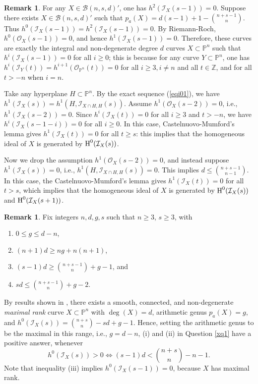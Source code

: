 \documentclass[a4, 11pt]{amsart}
\theoremstyle{plain}
\theoremstyle{definition}
\newtheorem{remark}[theorem]{Remark}
\newcommand{\enm}[1]{\ensuremath{#1}}          %
\newcommand{\cal}[1]{\mathcal{#1}}
\newcommand{\ZZ}{\enm{\mathbb{Z}}}
\newcommand{\PP}{\enm{\mathbb{P}}}
\newcommand{\Bb}{\enm{\cal{B}}}
\newcommand{\Ii}{\enm{\cal{I}}}
\newcommand{\Oo}{\enm{\cal{O}}}
\begin{document}
\begin{remark}
For any $X\in \Bb (n,s,d)'$, one has $h^2(\Ii _X(s-1))=0$. Suppose there exists $X\in \Bb (n,s,d)'$ such that $p_a(X) =d(s-1)+1-\binom{n+s-1}{n}$. Thus 
$h^0(\Ii _X(s-1)) = h^2(\Ii _X(s-1)) =0$. By Riemann-Roch, $h^0(\Oo _X(s-1))=0$, and hence $h^1(\Ii _X(s-1)) =0$. Therefore, these curves are exactly the integral and non-degenerate degree $d$
curves $X\subset \PP^n$ such that $h^i(\Ii _X(s-1)) =0$ for all $i\ge 0$; this is because for any curve $Y\subset \PP^n$, one has
 $h^i(\Ii_Y(t)) =h^{i+1}(\Oo _{\PP^n}(t))=0$ for all $i\ge 3, i\neq n$ and all $t\in \ZZ$, and for all $t>-n$ when $i=n$. 
 
Take any hyperplane $H\subset \PP^n$. By the exact sequence (\ref{eqi01}), we
have $h^1(\Ii _X(s)) = h^1(H,\Ii _{X\cap H,H}(s))$. 
Assume $h^1(\Oo _X(s-2))=0$, i.e., $h^1(\Ii _X(s-2))=0$.
Since $h^i(\Ii _X(t)) =0$ for all $i\ge 3$ and $t> -n$, we have $h^i(\Ii _X(s-1-i)) =0$ for all $i\ge 0$. In this case,
Castelnuovo-Mumford's lemma gives $h^1(\Ii _X(t)) =0$ for all $t\ge s$: this implies that the homogeneous ideal of $X$ is generated by
$\textnormal{H}^0(\mathcal I_X(s))$. 

Now we drop the assumption $h^1(\Oo _X(s-2))=0$, and instead suppose $h^1(\Ii _X(s)) =0$,
i.e., $h^1(H,\Ii _{X\cap H,H}(s))=0$. This implies $d\le \binom{n+s-1}{n-1}$. In this case,
the Castelnuovo-Mumford's lemma gives $h^1(\Ii _X(t)) =0$ for all $t>s$, which implies that the homogeneous ideal of $X$ is generated by
$\textnormal{H}^0(\mathcal I_X(s))$ and $\textnormal{H}^0(\mathcal I_X(s+1))$.
\end{remark}


\begin{remark}\label{numrangexq1true}
Fix integers $n, d, g, s$ such that $n\ge 3$, $s\ge 3$, with 
\begin{enumerate}
\item[(i)] $0 \le g \le d-n$, 

\item[(ii)] $(n+1)d \ge ng +n(n+1)$,

\item[(iii)] $(s-1)d \ge \binom{n+s-1}{n} +g-1$, and

\item[(iv)] $sd \le \binom{n+s-1}{n}+g-2$.
\end{enumerate}
By results shown in \cite{be2, be4, be5}, there exists a smooth, connected, and non-degenerate {\it maximal rank} 
curve $X\subset \PP^n$ with $\deg (X) = d$, arithmetic genus $p_a(X)=g$, and $h^0(\Ii _X(s)) =\binom{n+s}{n} -sd+g-1$. Hence, setting the arithmetic genus to be the maximal in this range, i.e., $g=d-n$, (i) and (ii) in Question \ref{xq1} have a positive answer, whenever
\[
h^0(\Ii _X(s))>0 \Longleftrightarrow (s-1)d < \binom{n+s}{n} -n-1.
\]
Note that inequality (iii) implies $h^0(\Ii _X(s-1)) = 0$, because $X$ has maximal rank. 
\end{remark}
\end{document}
